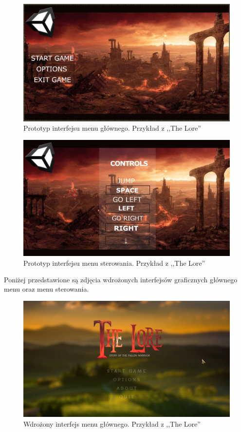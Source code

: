 \documentclass[oneside,polski,logo]{amuthesis}
\begin{document}
\begin{figure}[h]
	\centering
	\includegraphics[width=14cm]{images/hyps/proto.png}
	\caption{Prototyp interfejsu menu głównego. Przykład z ,,The Lore''}
\end{figure}

\begin{figure}[h]
	\centering
	\includegraphics[width=14cm]{images/hyps/proto2.jpg}
	\caption{Prototyp interfejsu menu sterowania. Przykład z ,,The Lore''}
\end{figure}

Poniżej przedstawione są zdjęcia wdrożonych interfejsów graficznych głównego menu oraz menu sterowania. \\

\begin{figure}[h!]
	\centering
	\includegraphics[width=14cm]{images/hyps/of1.png}
	\caption{Wdrożony interfejs menu głównego. Przykład z ,,The Lore''}
\end{figure}
\end{document}
